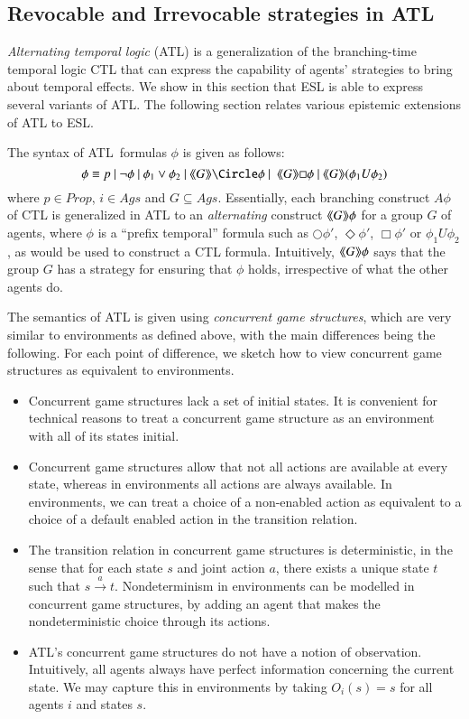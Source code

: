 \documentclass[a4wide]{article}
\newcommand{\ATL}{ATL}
\newcommand{\until}{U}
\newcommand{\ptrans}[1]{\stackrel{#1}{\longrightarrow}}
\newcommand{\Prop}{Prop}
\theoremstyle{examplesty}
\newcommand{\Ags}{\mathit{Ags}}
\newcommand{\atlop}[1]{\langle\hspace{-2pt}\langle #1 \rangle \hspace{-2pt}\rangle }
\newcommand{\nxt}{\Circle}
\newcommand{\always}{\Box}
\newcommand{\sometimes}{\Diamond}
\begin{document}
 
\subsection{Revocable and Irrevocable strategies in ATL}  \label{sec:atltrans} 

\emph{Alternating temporal logic} (ATL) \cite{ATLJACM} is a generalization
of the branching-time temporal logic CTL that can express the
capability of 
agents' strategies
 to bring about temporal effects.  
We show in this section that ESL is able to express several variants of ATL. 
The following section relates various epistemic extensions of ATL to ESL. 
 
The syntax of \ATL\ formulas $\phi$ is given as follows: 
$$\phi \equiv p ~|~\neg \phi~|~\phi_1 \lor \phi_2~|~\atlop{G}\nxt\phi ~|~~\atlop{G}\always\phi ~|~\atlop{G}(\phi_1 \until \phi_2) $$
where $p \in \Prop$, $i \in \Ags$ and $G\subseteq \Ags$. 
Essentially, each branching construct $A\phi$ 
of CTL is generalized  in ATL 
to an \emph{alternating} construct $\atlop{G} \phi$ for
a group $G$ of agents, where $\phi$ is a ``prefix temporal'' formula such as 
$\nxt \phi'$, $\sometimes \phi'$, $\always\phi'$ or 
$\phi_1 \until \phi_2$, as would be used to construct a CTL 
formula. 
Intuitively, $\atlop{G} \phi$ says that the group $G$ has a strategy for ensuring that $\phi$ holds, 
irrespective of what the other agents do. 

The semantics of ATL is given using \emph{concurrent game structures}, which are very similar to
environments as defined above, with the main differences being the following. For each point of difference, 
we sketch how to view concurrent game structures as equivalent to environments. 
\begin{itemize} 
\item Concurrent game structures lack a set of initial states. 
It is convenient for technical reasons to treat a concurrent
game structure as an environment with all of its states initial.

 \item Concurrent game structures allow that not all actions are available at every state, 
whereas in environments all actions are always available. In environments, we can treat a choice of a non-enabled
action as equivalent to a choice of a default enabled action in the transition relation. 

\item 
The transition relation in concurrent game structures is deterministic, in the sense that for each state $s$ and joint action $a$, there exists 
a unique state $t$ such that $s\ptrans{a} t$. Nondeterminism in environments can be modelled in concurrent game structures, 
by adding an agent that makes the nondeterministic choice through its actions. 

\item ATL's concurrent game structures do not have a notion of observation. Intuitively, all agents
always have perfect information concerning the current state. We may capture this in environments
by taking $O_i(s) =s$ for all agents $i$ and states $s$. 
\end{itemize} 
\end{document}
